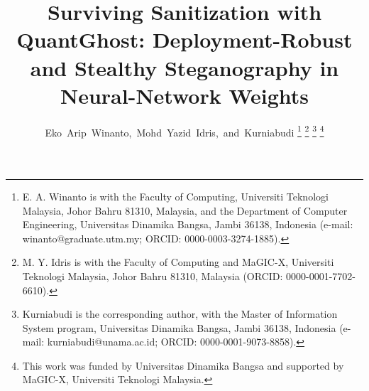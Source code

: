 \documentclass[10pt,journal]{IEEEtran}
\theoremstyle{remark}
\newcommand{\sys}{\mbox{QuantGhost}}
\begin{document}
\title{Surviving Sanitization with \sys: Deployment-Robust and Stealthy Steganography in Neural-Network Weights}
\author{Eko~Arip~Winanto,~Mohd~Yazid~Idris,~and~Kurniabudi%
\thanks{E. A. Winanto is with the Faculty of Computing, Universiti Teknologi Malaysia, Johor Bahru 81310, Malaysia, and the Department of Computer Engineering, Universitas Dinamika Bangsa, Jambi 36138, Indonesia (e-mail: winanto@graduate.utm.my; ORCID: \mbox{0000-0003-3274-1885}).}%
\thanks{M. Y. Idris is with the Faculty of Computing and MaGIC-X, Universiti Teknologi Malaysia, Johor Bahru 81310, Malaysia (ORCID: \mbox{0000-0001-7702-6610}).}%
\thanks{Kurniabudi is the corresponding author, with the Master of Information System program, Universitas Dinamika Bangsa, Jambi 36138, Indonesia (e-mail: kurniabudi@unama.ac.id; ORCID: \mbox{0000-0001-9073-8858}).}%
\thanks{This work was funded by Universitas Dinamika Bangsa and supported by MaGIC-X, Universiti Teknologi Malaysia.}}
\maketitle
{}
\end{document}
